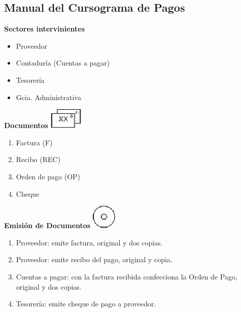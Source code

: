 \subsection{Manual del Cursograma de Pagos}

\begin{center}\textbf{Sectores intervinientes}\end{center}
\begin{itemize}
  \item Proveedor
  \item Contaduría (Cuentas a pagar)
  \item Tesorería
  \item Gcia. Administrativa
\end{itemize}

\begin{center}
  \textbf{Documentos}
  \includegraphics{./Images/Simbolos/simbolo-Documentos.png}
\end{center}
\begin{enumerate}
  \item Factura (F)
  \item Recibo (REC)
  \item Orden de pago (OP)
  \item Cheque
\end{enumerate}

\begin{center}
  \textbf{Emisión de Documentos}
  \includegraphics{./Images/Simbolos/simbolo-Emision-de-Documentos.png}
\end{center}
\begin{enumerate}
  \item Proveedor: emite factura, original y dos copias.
  \item Proveedor: emite recibo del pago, original y copia.
  \item Cuentas a pagar: con la factura recibida confecciona la Orden de Pago, original y dos copias.
  \item Tesorería: emite cheque de pago a proveedor.
\end{enumerate}

